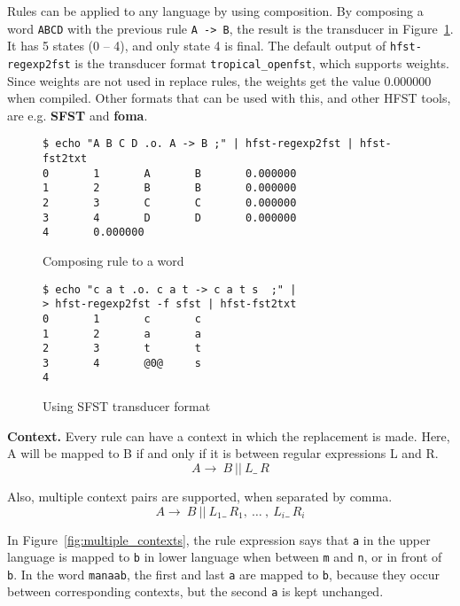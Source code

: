 \documentclass{llncs}
\begin{document}
Rules can be applied to any language by using composition. 
By composing a word \verb!ABCD! with the previous rule \verb!A -> B!, 
the result is the transducer in Figure~\ref{fig:replace_compose}. 
It has 5 states (0 -- 4), and only state 4 is final. The default output of \verb!hfst-regexp2fst! is 
the transducer format \verb!tropical_openfst!, which supports weights. 
Since weights are not used in replace rules, the weights get the value 0.000000 when compiled. 
Other formats that can be used with this, and other HFST tools, are e.g. \textbf{SFST} and \textbf{foma}.

\begin{figure} [h!]
\begin{verbatim}
$ echo "A B C D .o. A -> B ;" | hfst-regexp2fst | hfst-fst2txt
0       1       A       B       0.000000
1       2       B       B       0.000000
2       3       C       C       0.000000
3       4       D       D       0.000000
4       0.000000
\end{verbatim}
\caption{Composing rule to a word}
\label{fig:replace_compose}
\end{figure}


\begin{figure} [h!]
\begin{verbatim}
$ echo "c a t .o. c a t -> c a t s  ;" |
> hfst-regexp2fst -f sfst | hfst-fst2txt
0       1       c       c
1       2       a       a
2       3       t       t
3       4       @0@     s
4
\end{verbatim}
\caption{Using SFST transducer format}
\label{fig:sfst_format}
\end{figure}



\textbf{Context.} Every rule can have a context in which the replacement is made. 
Here, A will be mapped to B if and only if it is between regular expressions
L and R.
\begin{equation}
  A \rightarrow\ B\ ||\ L \_\  R
\end{equation}

Also, multiple context pairs are supported, when separated by comma.
\begin{equation}
  A \rightarrow\ B\ ||\ L_1 \_\  R_1 ,\ \ldots\ ,\ L_i \_\  R_i
\end{equation}

In Figure~\ref{fig:multiple_contexts}, the rule expression says that \verb!a! in the 
upper language is mapped to \verb!b! in lower language 
when between \verb!m! and \verb!n!, or in front of \verb!b!. 
In the word \verb!manaab!, the first and last \verb!a! are mapped to \verb!b!, 
because they occur between corresponding contexts, but the second \verb!a! is kept unchanged.
\end{document}

